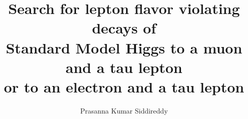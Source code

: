 \documentclass[review,numrefs,sort&compress]{nddiss2e}
\begin{document}
\newcommand{\tauj}{\ensuremath{\Pgt_{\text{j}}}\xspace}
\newcommand{\tauh}{\ensuremath{\Pgt_{\text{h}}}\xspace}
\newcommand{\taum}{\ensuremath{\Pgt_{\Pgm}}\xspace}
\newcommand{\taue}{\ensuremath{\Pgt_{\Pe}}\xspace}
\newcommand{\tvis}{\ensuremath{\Pgt^{\text{vis}}}\xspace}

\newcommand{\pzeta}{\ensuremath{P_{\zeta}}\xspace}
\newcommand{\mh}{\ensuremath{m_{\text{H}}}\xspace}
\newcommand{\mjj}{\ensuremath{M_{jj}}\xspace}
\newcommand{\mcol}{\ensuremath{M_{\text{col}}}\xspace}
\newcommand{\mvis}{\ensuremath{M_{\text{vis}}}\xspace}
\newcommand{\mt}{\ensuremath{M_\mathrm{T}}\xspace}
\newcommand{\msig}{\ensuremath{100\:\GeV< M_{collinear} < \: 150\:\GeV}\xspace}
\newcommand{\mtt}{\ensuremath{\text{m}_{\Pgt \Pgt}}\xspace}
\newcommand{\mlt}{\ensuremath{\text{m}_{\ell \Pgt}}\xspace}
\newcommand{\bp}{\ensuremath{\boldsymbol{p}}\xspace}

\newcommand{\wjets}{\ensuremath{\PW+\text{jets}}\xspace}
\newcommand{\zjets}{\ensuremath{\PZ+\text{jets}}\xspace}
\newcommand{\ttbar}{\ensuremath{t\overline{t}}\xspace}

\newcommand{\as}{\ensuremath{\alpha_{S}}\xspace}
\newcommand{\aem}{\ensuremath{\alpha}\xspace}
\newcommand{\MCATNLO} {\textsc{mc@nlo}\xspace}
\newcommand{\aMCATNLO} {\textsc{MG5}\_a\MCATNLO\xspace}

\newcommand{\dphitauhmet}{\ensuremath{\Delta\phi(\Pgt_{\text{h}},\ptvecmiss)}\xspace}
\newcommand{\dphimtauh}{\ensuremath{\Delta\phi(\Pgm,\Pgt_{\text{h}})}\xspace}
\newcommand{\dphietauh}{\ensuremath{\Delta\phi(\Pe,\Pgt_{\text{h}})}\xspace}
\newcommand{\dphimmet}{\ensuremath{\Delta\phi(\Pgm,\ptvecmiss)}\xspace}
\newcommand{\dphiemet}{\ensuremath{\Delta\phi(\Pe,\ptvecmiss)}\xspace}
\newcommand{\dphiem}{\ensuremath{\Delta\phi(\Pe,\Pgm)}\xspace}
\newcommand{\detamtauh}{\ensuremath{\Delta\eta(\Pgm,\Pgt_{\text{h}})}\xspace}
\newcommand{\detaetauh}{\ensuremath{\Delta\eta(\Pe,\Pgt_{\text{h}})}\xspace}

\newlength\cmsTabSkip
\setlength\cmsTabSkip{2ex}


\frontmatter %

\title{Search for lepton flavor violating decays of \protect\\ Standard Model Higgs to a muon and a tau lepton \protect\\ or to an electron and a tau lepton}
\author{Prasanna Kumar Siddireddy}
\end{document}
